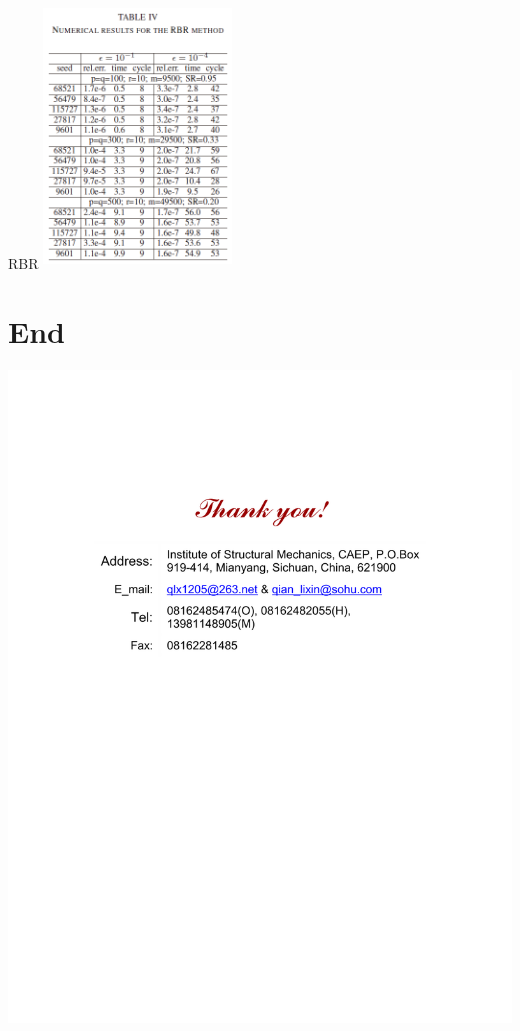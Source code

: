 \documentclass[slidestop, compress, mathserif, UTF8]{beamer}
\numberwithin{equation}{section}                                        %
\begin{document}
            \begin{frame}[t]{RBR}
                \centering
                    \includegraphics[width=5cm,height=7cm]{src//4.png}
            \end{frame}
    \section*{End}                              %
        \begin{frame}
            \vspace{35mm}                       %
            \centering                          %
                \includegraphics{src//Thanks.pdf}    %
        \end{frame}
\end{document}
